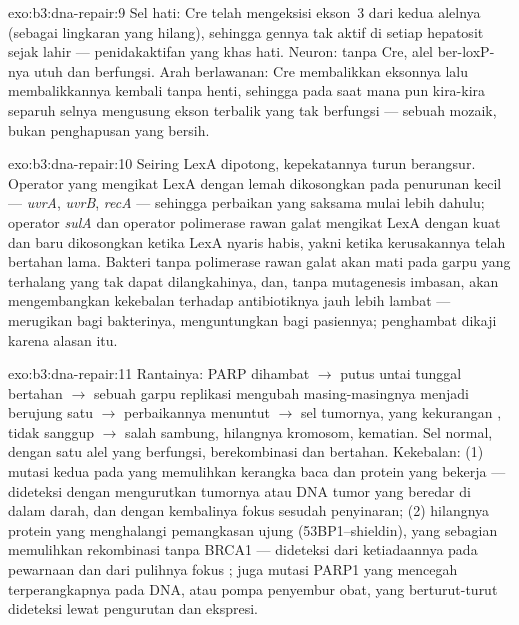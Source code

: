 \begin{solution}{exo:b3:dna-repair:9}
Sel hati: Cre telah mengeksisi ekson~3 dari kedua alelnya (sebagai
lingkaran yang hilang), sehingga gennya tak aktif di setiap hepatosit sejak
lahir --- penidakaktifan yang khas hati. Neuron: tanpa Cre, alel ber-loxP-nya
utuh dan berfungsi. Arah berlawanan: Cre membalikkan eksonnya lalu
membalikkannya kembali tanpa henti, sehingga pada saat mana pun kira-kira
separuh selnya mengusung ekson terbalik yang tak berfungsi --- sebuah mozaik,
bukan penghapusan yang bersih.
\end{solution}

\begin{solution}{exo:b3:dna-repair:10}
Seiring LexA dipotong, kepekatannya turun berangsur. Operator yang
mengikat LexA dengan lemah dikosongkan pada penurunan kecil --- \emph{uvrA},
\emph{uvrB}, \emph{recA} --- sehingga perbaikan yang saksama mulai lebih
dahulu; operator \emph{sulA} dan operator polimerase rawan galat mengikat
LexA dengan kuat dan baru dikosongkan ketika LexA nyaris habis, yakni ketika
kerusakannya telah bertahan lama. Bakteri tanpa polimerase rawan
galat akan mati pada garpu yang terhalang  yang tak dapat
dilangkahinya, dan, tanpa mutagenesis imbasan, akan mengembangkan kekebalan
terhadap antibiotiknya jauh lebih lambat --- merugikan bagi bakterinya,
menguntungkan bagi pasiennya; penghambat  dikaji karena alasan
itu.
\end{solution}

\begin{solution}{exo:b3:dna-repair:11}
Rantainya: PARP dihambat $\to$ putus untai tunggal bertahan $\to$ sebuah
garpu replikasi mengubah masing-masingnya menjadi  berujung satu
$\to$ perbaikannya menuntut  $\to$ sel tumornya, yang
kekurangan , tidak sanggup $\to$ salah sambung, hilangnya kromosom,
kematian. Sel normal, dengan satu alel yang berfungsi, berekombinasi dan
bertahan. Kekebalan: (1) mutasi kedua pada \emph{} yang memulihkan
kerangka baca dan protein yang bekerja --- dideteksi dengan mengurutkan
tumornya atau DNA tumor yang beredar di dalam darah, dan dengan kembalinya
fokus  sesudah penyinaran; (2) hilangnya protein yang menghalangi
pemangkasan ujung (53BP1--shieldin), yang sebagian memulihkan rekombinasi
tanpa BRCA1 --- dideteksi dari ketiadaannya pada pewarnaan dan dari pulihnya
fokus ; juga mutasi PARP1 yang mencegah terperangkapnya pada DNA, atau
pompa penyembur obat, yang berturut-turut dideteksi lewat pengurutan dan
ekspresi.
\end{solution}

